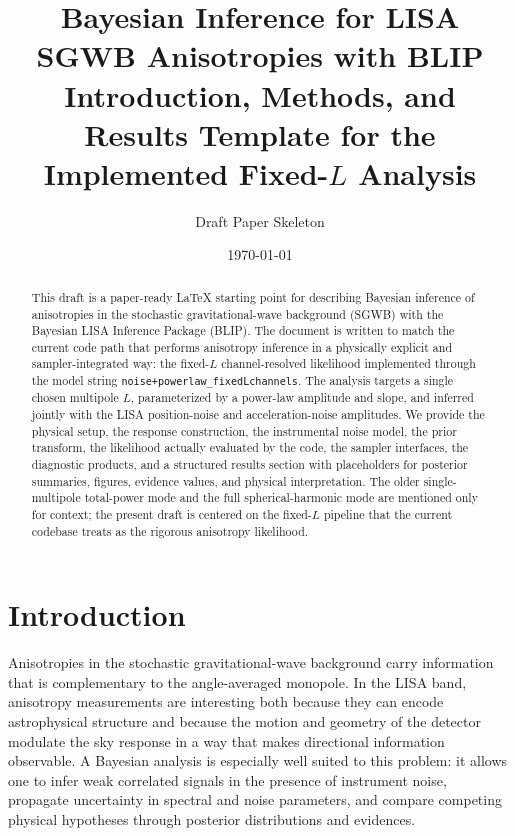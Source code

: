 \documentclass[11pt]{article}
\title{Bayesian Inference for LISA SGWB Anisotropies with BLIP\\
\large Introduction, Methods, and Results Template for the Implemented Fixed-$L$ Analysis}
\author{Draft Paper Skeleton}
\date{\today}
\begin{document}
\maketitle

\begin{abstract}
This draft is a paper-ready \LaTeX{} starting point for describing Bayesian inference of anisotropies in the stochastic gravitational-wave background (SGWB) with the Bayesian LISA Inference Package (BLIP). The document is written to match the current code path that performs anisotropy inference in a physically explicit and sampler-integrated way: the fixed-$L$ channel-resolved likelihood implemented through the model string \texttt{noise+powerlaw\_fixedLchannels}. The analysis targets a single chosen multipole $L$, parameterized by a power-law amplitude and slope, and inferred jointly with the LISA position-noise and acceleration-noise amplitudes. We provide the physical setup, the response construction, the instrumental noise model, the prior transform, the likelihood actually evaluated by the code, the sampler interfaces, the diagnostic products, and a structured results section with placeholders for posterior summaries, figures, evidence values, and physical interpretation. The older single-multipole total-power mode and the full spherical-harmonic mode are mentioned only for context; the present draft is centered on the fixed-$L$ pipeline that the current codebase treats as the rigorous anisotropy likelihood.
\end{abstract}

\tableofcontents

\section{Introduction}

Anisotropies in the stochastic gravitational-wave background carry information that is complementary to the angle-averaged monopole. In the LISA band, anisotropy measurements are interesting both because they can encode astrophysical structure and because the motion and geometry of the detector modulate the sky response in a way that makes directional information observable. A Bayesian analysis is especially well suited to this problem: it allows one to infer weak correlated signals in the presence of instrument noise, propagate uncertainty in spectral and noise parameters, and compare competing physical hypotheses through posterior distributions and evidences.
\end{document}
